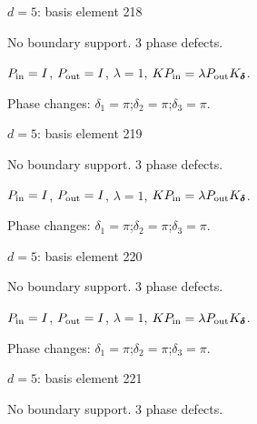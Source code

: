 {\Large $d=5$: basis element 218}\par
No boundary support. 3 phase defects.
\begin{center}
\end{center}
\vspace{-1mm}
$P_{\rm in}=I$, \quad $P_{\rm out}=I$, \quad $\lambda=1$, \qquad $K P_{\rm in}=\lambda P_{\rm out}K_{\boldsymbol\delta}$.
\par\smallskip\begin{minipage}{.98\linewidth}\small Phase changes: $\delta_{1}=\pi$;\quad $\delta_{2}=\pi$;\quad $\delta_{3}=\pi$.\end{minipage}
\vfill
{\footnotesize\texttt{}}
\newpage
{}
{\Large $d=5$: basis element 219}\par
No boundary support. 3 phase defects.
\begin{center}
\end{center}
\vspace{-1mm}
$P_{\rm in}=I$, \quad $P_{\rm out}=I$, \quad $\lambda=1$, \qquad $K P_{\rm in}=\lambda P_{\rm out}K_{\boldsymbol\delta}$.
\par\smallskip\begin{minipage}{.98\linewidth}\small Phase changes: $\delta_{1}=\pi$;\quad $\delta_{2}=\pi$;\quad $\delta_{3}=\pi$.\end{minipage}
\vfill
{\footnotesize\texttt{}}
\newpage
{}
{\Large $d=5$: basis element 220}\par
No boundary support. 3 phase defects.
\begin{center}
\end{center}
\vspace{-1mm}
$P_{\rm in}=I$, \quad $P_{\rm out}=I$, \quad $\lambda=1$, \qquad $K P_{\rm in}=\lambda P_{\rm out}K_{\boldsymbol\delta}$.
\par\smallskip\begin{minipage}{.98\linewidth}\small Phase changes: $\delta_{1}=\pi$;\quad $\delta_{2}=\pi$;\quad $\delta_{3}=\pi$.\end{minipage}
\vfill
{\footnotesize\texttt{}}
\newpage
{}
{\Large $d=5$: basis element 221}\par
No boundary support. 3 phase defects.
